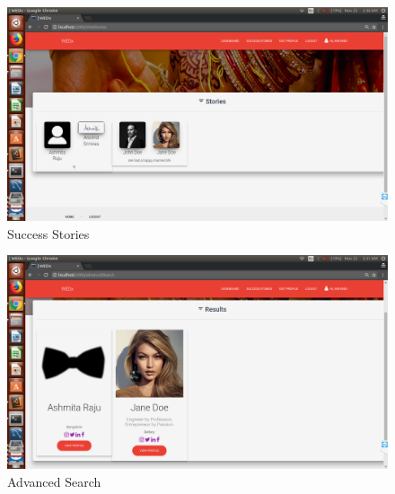 \documentclass[12pt]{report}
\begin{document}
\begin{figure}[!htb]
    \centering
    \includegraphics[width=1\textwidth]{sc-23.png}
    \caption{Success Stories}
    \label{fig:Success Stories}
\end{figure}

\begin{figure}[!htb]
    \centering
    \includegraphics[width=1\textwidth]{sc-24.png}
    \caption{Advanced Search}
    \label{fig:Advanced Search}
\end{figure}
\end{document}
